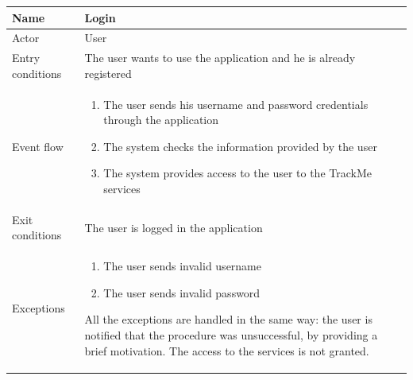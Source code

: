 \begin{table}[H]
\begin{tabularx}{\textwidth}{|l|X|}
\hline
 Name & Login \\ \hline
 Actor & User \\ \hline
 Entry conditions & The user wants to use the application and he is already registered \\ \hline
 Event flow & 
 \begin{enumerate}
 	\item The user sends his username and password credentials through the application
  	\item The system checks the information provided by the user
 	\item The system provides access to the user to the TrackMe services
 \end{enumerate}   \\ \hline
 Exit conditions & The user is logged in the application \\ \hline
 Exceptions &  
 \begin{enumerate}
 	\item The user sends invalid username
 	\item The user sends invalid password 
 \end{enumerate}
 All the exceptions are handled in the same way: the user is notified that the procedure was unsuccessful, by providing a brief motivation. The access to the services is not granted. 
 \\ \hline
\end{tabularx}
\end{table}